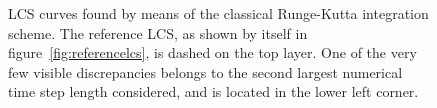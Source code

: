 \begin{figure}[htpb]
    \centering
    
    \caption[LCS curves found by means of the classical Runge-Kutta integration scheme]{
        LCS curves found by means of the classical Runge-Kutta integration scheme. The
        reference LCS, as shown by itself in figure~\ref{fig:referencelcs},
        is dashed on the top layer. One of the very few visible
        discrepancies belongs to the second largest numerical time step length
        considered, and is located in the lower left corner.}
    \label{fig:lcs_rk4}
\end{figure}
